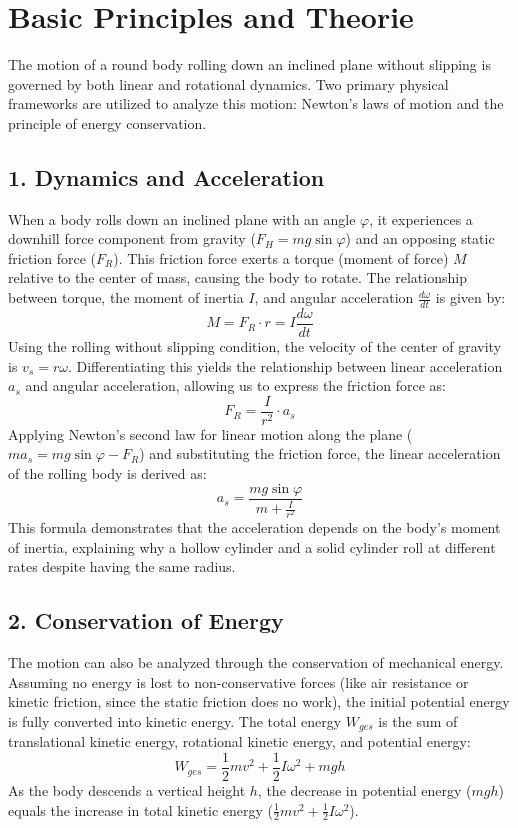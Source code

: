 \documentclass[12pt,a4paper,titlepage]{scrartcl}
\numberwithin{equation}{section}
\numberwithin{table}{section}
\numberwithin{figure}{section}
\begin{document}
\section{Basic Principles and Theorie}\label{sec:Grundlagen}
The motion of a round body rolling down an inclined plane without slipping is governed by both linear and rotational dynamics. Two primary physical frameworks are utilized to analyze this motion: Newton's laws of motion and the principle of energy conservation.

\subsection*{1. Dynamics and Acceleration}
When a body rolls down an inclined plane with an angle $\varphi$, it experiences a downhill force component from gravity ($F_H = mg \sin\varphi$) and an opposing static friction force ($F_R$). This friction force exerts a torque (moment of force) $M$ relative to the center of mass, causing the body to rotate. The relationship between torque, the moment of inertia $I$, and angular acceleration $\frac{d\omega}{dt}$ is given by:
\begin{equation}
    M = F_R \cdot r = I \frac{d\omega}{dt}
\end{equation}
Using the rolling without slipping condition, the velocity of the center of gravity is $v_s = r\omega$. Differentiating this yields the relationship between linear acceleration $a_s$ and angular acceleration, allowing us to express the friction force as:
\begin{equation}
    F_R = \frac{I}{r^2} \cdot a_s
\end{equation}
Applying Newton's second law for linear motion along the plane ($m a_s = mg \sin\varphi - F_R$) and substituting the friction force, the linear acceleration of the rolling body is derived as:
\begin{equation}
    a_s = \frac{mg \sin\varphi}{m + \frac{I}{r^2}}
\end{equation}
This formula demonstrates that the acceleration depends on the body's moment of inertia, explaining why a hollow cylinder and a solid cylinder roll at different rates despite having the same radius.

\subsection*{2. Conservation of Energy}
The motion can also be analyzed through the conservation of mechanical energy. Assuming no energy is lost to non-conservative forces (like air resistance or kinetic friction, since the static friction does no work), the initial potential energy is fully converted into kinetic energy. The total energy $W_{ges}$ is the sum of translational kinetic energy, rotational kinetic energy, and potential energy:
\begin{equation}
    W_{ges} = \frac{1}{2}mv^2 + \frac{1}{2}I\omega^2 + mgh
\end{equation}
As the body descends a vertical height $h$, the decrease in potential energy ($mgh$) equals the increase in total kinetic energy ($\frac{1}{2}mv^2 + \frac{1}{2}I\omega^2$).
\end{document}
